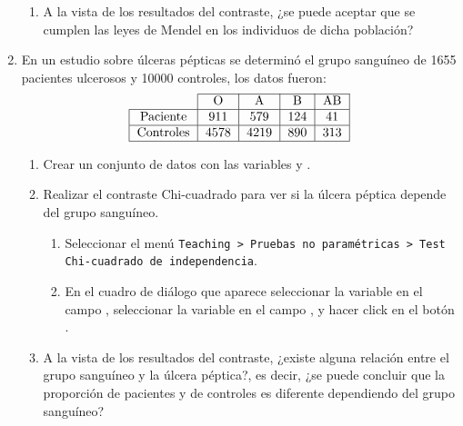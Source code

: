 \begin{enumerate}[leftmargin=*]
\begin{enumerate}
\item A la vista de los resultados del contraste, ¿se puede aceptar que se cumplen las leyes de Mendel en los individuos
de dicha población?
\end{enumerate}


\item En un estudio sobre úlceras pépticas se determinó el grupo sanguíneo de 1655 pacientes ulcerosos y 10000
controles, los datos fueron:
\[
\begin{tabular}{|l|l|l|l|l|}
\cline{2-5}
\multicolumn{1}{c|}{} & \multicolumn{1}{c|}{O} & \multicolumn{1}{c|}{A} & \multicolumn{1}{c|}{B} & \multicolumn{1}{c|}{AB} \\
\hline
\multicolumn{1}{|c|}{Paciente} & \multicolumn{1}{c|}{911} & \multicolumn{1}{c|}{579} & \multicolumn{1}{c|}{124} & \multicolumn{1}{c|}{41} \\
\hline
\multicolumn{1}{|c|}{Controles} & \multicolumn{1}{c|}{4578} & \multicolumn{1}{c|}{4219} & \multicolumn{1}{c|}{890} & \multicolumn{1}{c|}{313} \\
\hline
\end{tabular}
\]

\begin{enumerate}
\item Crear un conjunto de datos con las variables  y .

\item Realizar el contraste Chi-cuadrado para ver si la úlcera péptica depende del grupo sanguíneo.  
\begin{indicacion}
\begin{enumerate}
\item Seleccionar el menú \texttt{Teaching > Pruebas no paramétricas > Test Chi-cuadrado de independencia}.
\item En el cuadro de diálogo que aparece seleccionar la variable  en el campo
, seleccionar la variable  en el campo , y hacer click en el botón .
\end{enumerate}
\end{indicacion}

\item A la vista de los resultados del contraste, ¿existe alguna relación entre el grupo sanguíneo y la úlcera péptica?,
es decir, ¿se puede concluir que la proporción de pacientes y de controles es diferente dependiendo del grupo sanguíneo?
\end{enumerate}


\end{enumerate}
